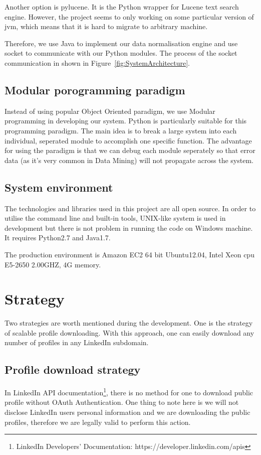 Another option is pylucene. It is the Python wrapper for Lucene text search engine. However, the project seems to only working on some particular version of \gls{jvm}, which means that it is hard to migrate to arbitrary machine.

Therefore, we use Java to implement our data normalisation engine and use socket to communicate with our Python modules. The process of the socket communication in shown in Figure~\ref{fig:SystemArchitecture}.

\subsection{Modular porogramming paradigm}
Instead of using popular Object Oriented paradigm, we use Modular programming in developing our system. Python is particularly suitable for this programming paradigm. The main idea is to break a large system into each individual, seperated module to accomplish one specific function. The advantage for using the paradigm is that we can debug each module seperately so that error data (as it's very common in Data Mining) will not propagate across the system.

\subsection{System environment}\label{subsec:env}
The technologies and libraries used in this project are all open source. In order to utilise the command line and built-in tools, UNIX-like system is used in development but there is not problem in running the code on Windows machine. It requires Python2.7 and Java1.7.

The production environment is Amazon EC2 64 bit Ubuntu12.04, Intel Xeon \acrlong{cpu} E5-2650 2.00GHZ, 4G memory.

\section{Strategy}

Two strategies are worth mentioned during the development. One is the strategy of scalable profile downloading. With this approach, one can easily download any number of profiles in any LinkedIn subdomain.

\subsection{Profile download strategy}
In LinkedIn API documentation\footnote{LinkedIn Developers' Documentation: https://developer.linkedin.com/apis}, there is no method for one to download public profile without OAuth Authentication. One thing to note here is we will not disclose LinkedIn users personal information and we are downloading the public profiles, therefore we are legally valid to perform this action.


